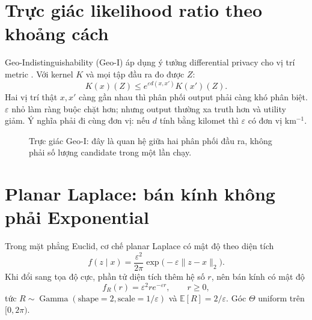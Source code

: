\documentclass[11pt,a4paper,oneside]{report}
\begin{document}
\section{Trực giác likelihood ratio theo khoảng cách}

Geo-Indistinguishability (Geo-I) áp dụng ý tưởng differential privacy cho vị trí
metric \cite{andres2013geo}. Với kernel $K$ và mọi tập đầu ra đo được $Z$:
\[
K(x)(Z)\le e^{\varepsilon d(x,x')}K(x')(Z).
\]
Hai vị trí thật $x,x'$ càng gần nhau thì phân phối output phải càng khó phân biệt.
$\varepsilon$ nhỏ làm ràng buộc chặt hơn; nhưng output thường xa truth hơn và utility
giảm. Ý nghĩa phải đi cùng đơn vị: nếu $d$ tính bằng kilomet thì $\varepsilon$ có
đơn vị km$^{-1}$.

\begin{figure}[htbp]
\centering
{}
\caption{Trực giác Geo-I: đây là quan hệ giữa hai phân phối đầu ra, không phải số lượng candidate trong một lần chạy.}
\label{fig:geo-i-overlap}
\end{figure}

\section{Planar Laplace: bán kính không phải Exponential}

Trong mặt phẳng Euclid, cơ chế planar Laplace có mật độ theo diện tích
\[
f(z\mid x)=\frac{\varepsilon^2}{2\pi}
\exp\bigl(-\varepsilon\lVert z-x\rVert_2\bigr).
\]
Khi đổi sang tọa độ cực, phần tử diện tích thêm hệ số $r$, nên bán kính có mật độ
\[
f_R(r)=\varepsilon^2 r e^{-\varepsilon r},\qquad r\ge0,
\]
tức $R\sim\operatorname{Gamma}(\text{shape}=2,\text{scale}=1/\varepsilon)$ và
$\mathbb{E}[R]=2/\varepsilon$. Góc $\Theta$ uniform trên $[0,2\pi)$.
\end{document}
